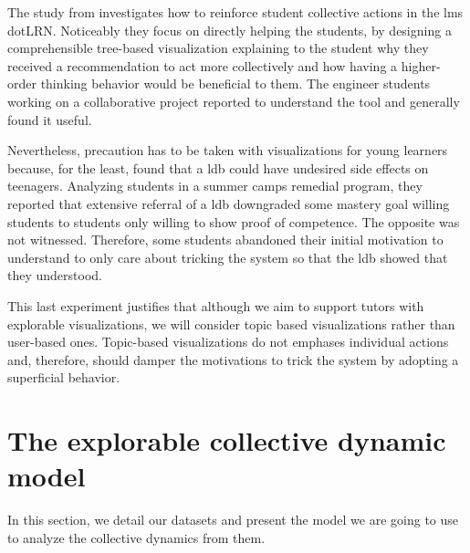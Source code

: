 \documentclass[a4paper,twoside]{article}
\begin{document}
The study from \cite{Anaya2016} investigates how to reinforce student collective actions in the \gls{lms} dotLRN.  Noticeably they focus on directly helping the students, by designing a comprehensible tree-based visualization explaining to the student why they received a recommendation to act more collectively and how having a higher-order thinking behavior would be beneficial to them.
The engineer students working on a collaborative project reported to understand the tool and generally found it useful.

Nevertheless, precaution has to be taken with visualizations for young learners because, for the least, \cite{Lonn2015} found that a \gls{ldb} could have undesired side effects on teenagers.  Analyzing students in a summer camps remedial program, they reported that extensive referral of a \gls{ldb} downgraded some mastery goal willing students to students only willing to show proof of competence.  The opposite was not witnessed.  Therefore, some students abandoned their initial motivation to understand to only care about tricking the system so that the \gls{ldb} showed that they understood.

This last experiment justifies that although we aim to support tutors with explorable visualizations, we will consider topic based visualizations rather than user-based ones.  Topic-based visualizations do not emphases individual actions and, therefore, should damper the motivations to trick the system by adopting a superficial behavior.


\section{The explorable collective dynamic model}
\label{section:4}
In this section, we detail our datasets and present the model we are going to use to analyze the collective dynamics from them.
\end{document}
